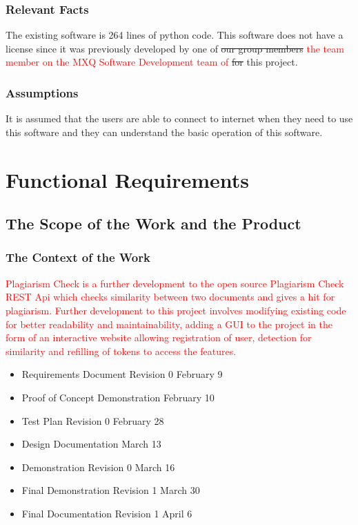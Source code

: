 \documentclass[12pt, titlepage]{article}
\begin{document}
\subsubsection{Relevant Facts}

The existing software is 264 lines of python code. This software does not have a license since it was previously developed by one of \st{our group members} \textcolor{red}{the team member on the MXQ Software Development team of} \st{for} this project.

\subsubsection{Assumptions}

It is assumed that the users are able to connect to internet when they need to use this software and they can understand the basic operation of this software.

\section{Functional Requirements}

\subsection{The Scope of the Work and the Product}

\subsubsection{The Context of the Work}
\textcolor{red}{Plagiarism Check is a further development to the open source Plagiarism Check REST Api which checks similarity between two documents and gives a hit for plagiarism. Further development to this project involves modifying existing code for better readability and maintainability, adding a GUI to the project in the form of an interactive website allowing registration of user, detection for similarity and refilling of tokens to access the features.}

\begin{itemize}
		\item Requirements Document Revision 0  February 9
		\item Proof of Concept Demonstration    February 10			
		\item Test Plan Revision 0              February 28 		
		\item Design Documentation				March 13
		\item Demonstration Revision 0		    March 16
		\item Final Demonstration Revision 1    March 30			
		\item Final Documentation Revision 1	April 6 
	\end{itemize}
	
\end{document}
